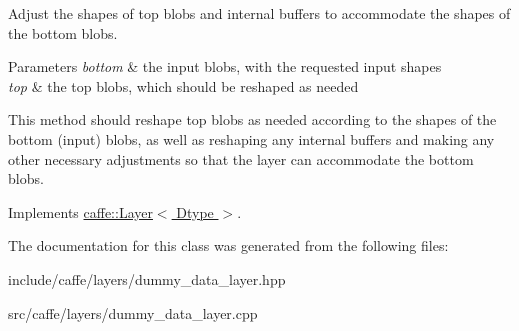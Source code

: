 Adjust the shapes of top blobs and internal buffers to accommodate the shapes of the bottom blobs. 


\begin{DoxyParams}{Parameters}
{\em bottom} & the input blobs, with the requested input shapes \\
\hline
{\em top} & the top blobs, which should be reshaped as needed\\
\hline
\end{DoxyParams}
This method should reshape top blobs as needed according to the shapes of the bottom (input) blobs, as well as reshaping any internal buffers and making any other necessary adjustments so that the layer can accommodate the bottom blobs. 

Implements \hyperlink{classcaffe_1_1Layer_ad9d391b972c769c0ebee34ca6d1c973e}{caffe\+::\+Layer$<$ Dtype $>$}.



The documentation for this class was generated from the following files\+:\begin{DoxyCompactItemize}
\item 
include/caffe/layers/dummy\+\_\+data\+\_\+layer.\+hpp\item 
src/caffe/layers/dummy\+\_\+data\+\_\+layer.\+cpp\end{DoxyCompactItemize}
